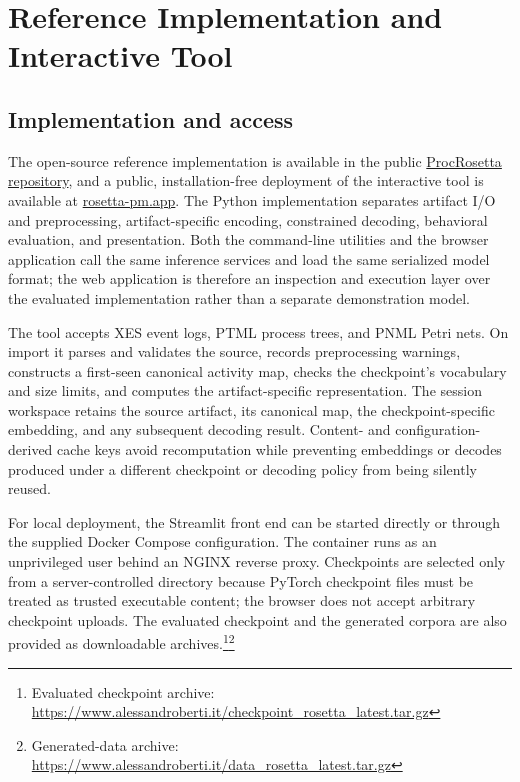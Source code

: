 \documentclass[applsci,supfile,submit,pdftex,moreauthors]{Definitions/mdpi}
\begin{document}
\FloatBarrier

\section{Reference Implementation and Interactive Tool}\label{sec:supp-implementation}

\subsection{Implementation and access}

The open-source reference implementation is available in the public \href{https://github.com/fit-alessandro-berti/proc-rosetta}{ProcRosetta repository}, and a public, installation-free deployment of the interactive tool is available at \href{https://rosetta-pm.app}{rosetta-pm.app}. The Python implementation separates artifact I/O and preprocessing, artifact-specific encoding, constrained decoding, behavioral evaluation, and presentation. Both the command-line utilities and the browser application call the same inference services and load the same serialized model format; the web application is therefore an inspection and execution layer over the evaluated implementation rather than a separate demonstration model.

The tool accepts XES event logs, PTML process trees, and PNML Petri nets. On import it parses and validates the source, records preprocessing warnings, constructs a first-seen canonical activity map, checks the checkpoint's vocabulary and size limits, and computes the artifact-specific representation. The session workspace retains the source artifact, its canonical map, the checkpoint-specific embedding, and any subsequent decoding result. Content- and configuration-derived cache keys avoid recomputation while preventing embeddings or decodes produced under a different checkpoint or decoding policy from being silently reused.

For local deployment, the Streamlit front end can be started directly or through the supplied Docker Compose configuration. The container runs as an unprivileged user behind an NGINX reverse proxy. Checkpoints are selected only from a server-controlled directory because PyTorch checkpoint files must be treated as trusted executable content; the browser does not accept arbitrary checkpoint uploads. The evaluated checkpoint and the generated corpora are also provided as downloadable archives.\footnote{Evaluated checkpoint archive: \url{https://www.alessandroberti.it/checkpoint_rosetta_latest.tar.gz}}\footnote{Generated-data archive: \url{https://www.alessandroberti.it/data_rosetta_latest.tar.gz}}
\end{document}
